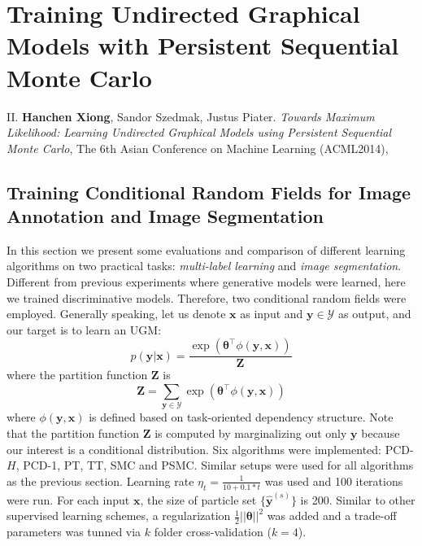 \section{Training Undirected Graphical Models with Persistent Sequential Monte Carlo}

\begin{shaded}
{\Huge II.} \textbf{Hanchen Xiong}, Sandor Szedmak, Justus Piater. {\it Towards Maximum Likelihood: Learning Undirected Graphical Models using Persistent Sequential Monte Carlo}, The 6th Asian Conference on Machine Learning (ACML2014), 
\end{shaded}


\subsection {Training Conditional Random Fields for Image Annotation and Image Segmentation}
In this section we present some evaluations and comparison of different learning algorithms on two practical tasks: \emph{multi-label learning} and \emph{image 
segmentation}. Different from previous experiments where generative models were learned, here we trained discriminative models. Therefore, two 
conditional random fields were employed. Generally speaking, let us denote $\mathbf{x}$ as input and $\mathbf{y}\in \mathcal{Y}$ as output, and our target is to 
learn an UGM:  
\begin{equation}
	p(\mathbf{y}|\mathbf{x})=\frac{\exp(\boldsymbol{\theta}^\top \phi(\mathbf{y},\mathbf{x}))}{\mathbf{Z}}
\end{equation}
where the partition function $\mathbf{Z}$ is
\begin{equation}
	\mathbf{Z}=\sum_{\mathbf{y}\in\mathcal{Y}}\exp(\boldsymbol{\theta}^\top \phi(\mathbf{y},\mathbf{x}))
\end{equation}
where $\phi(\mathbf{y},\mathbf{x})$ is defined based on task-oriented dependency structure. Note that the partition function $\mathbf{Z}$ is computed by 
marginalizing out only $\mathbf{y}$ because our interest is a conditional distribution. Six algorithms 
were implemented: PCD-$H$, PCD-1, PT, TT, SMC and PSMC. Similar setups were used for all algorithms as the previous section.  
Learning rate $\eta_t=\frac{1}{10+0.1*t}$ was used and 100 iterations were run. For each input $\mathbf{x}$, 
the size of particle set $\{ \hat{\mathbf{y}}^{(s)}\}$ is 200.  Similar to other supervised learning schemes, a regularization $\frac{1}{2}||\boldsymbol{\theta}||^2$ 
was added and a trade-off parameters was tunned via $k$ folder cross-validation ($k=4$).  

